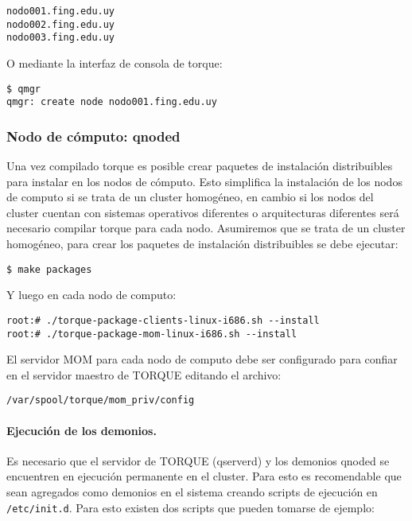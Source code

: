 \documentclass[a4paper,10pt,spanish]{article}
\begin{document}
\begin{verbatim}
nodo001.fing.edu.uy
nodo002.fing.edu.uy
nodo003.fing.edu.uy
\end{verbatim}

O mediante la interfaz de consola de torque:

\begin{verbatim}
$ qmgr
qmgr: create node nodo001.fing.edu.uy
\end{verbatim}

\subsubsection{Nodo de c\'{o}mputo: qnoded}

Una vez compilado torque es posible crear paquetes de instalaci\'{o}n distribuibles para instalar en los nodos de c\'{o}mputo. Esto simplifica la instalaci\'{o}n de los nodos de computo si se trata de un cluster homog\'{e}neo, en cambio si los nodos del cluster cuentan con sistemas operativos diferentes o arquitecturas diferentes ser\'{a} necesario compilar torque para cada nodo. Asumiremos que se trata de un cluster homog\'{e}neo, para crear los paquetes de instalaci\'{o}n distribuibles se debe ejecutar:

\begin{verbatim}
$ make packages
\end{verbatim}

Y luego en cada nodo de computo:

\begin{verbatim}
root:# ./torque-package-clients-linux-i686.sh --install
root:# ./torque-package-mom-linux-i686.sh --install
\end{verbatim}

El servidor MOM para cada nodo de computo debe ser configurado para confiar en el servidor maestro de TORQUE editando el archivo:

\begin{verbatim}
/var/spool/torque/mom_priv/config
\end{verbatim}

\paragraph{Ejecuci\'{o}n de los demonios.}

Es necesario que el servidor de TORQUE (qserverd) y los demonios qnoded se encuentren en ejecuci\'{o}n permanente en el cluster. Para esto es recomendable que sean agregados como demonios en el sistema creando scripts de ejecuci\'{o}n en \mbox{\texttt{/etc/init.d}}. Para esto existen dos scripts que pueden tomarse de ejemplo:
\end{document}
